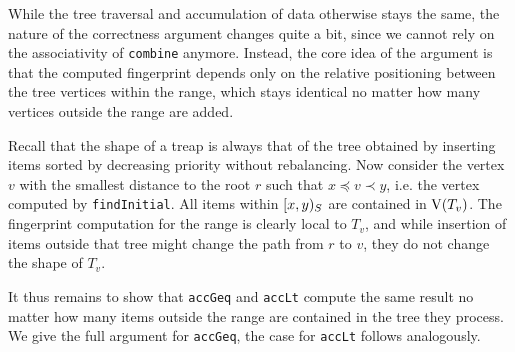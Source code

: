 While the tree traversal and accumulation of data otherwise stays the same, the nature of the correctness argument changes quite a bit, since we cannot rely on the associativity of \texttt{combine} anymore. Instead, the core idea of the argument is that the computed fingerprint depends only on the relative positioning between the tree vertices within the range, which stays identical no matter how many vertices outside the range are added.

Recall that the shape of a treap is always that of the tree obtained by inserting items sorted by decreasing priority without rebalancing. Now consider the vertex $v$ with the smallest distance to the root $r$ such that $x \preceq v \prec y$, i.e. the vertex computed by \texttt{findInitial}. All items within $[{x},{y})_{S}$ are contained in $\operatorname{V}(T_v)$. The fingerprint computation for the range is clearly local to $T_v$, and while insertion of items outside that tree might change the path from $r$ to $v$, they do not change the shape of $T_v$.

It thus remains to show that \texttt{accGeq} and \texttt{accLt} compute the same result no matter how many items outside the range are contained in the tree they process. We give the full argument for \texttt{accGeq}, the case for \texttt{accLt} follows analogously.

